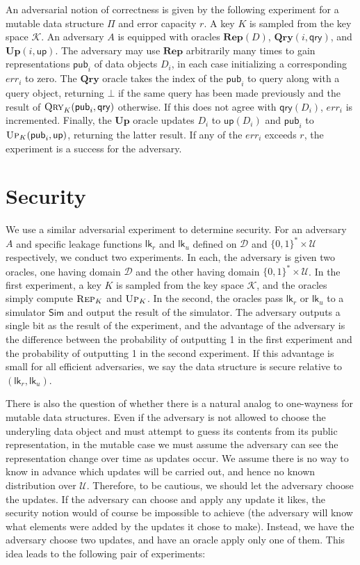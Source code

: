 \documentclass[11pt, pdftex]{article}
\begin{document}
An adversarial notion of correctness is given by the following experiment for a mutable data structure $\Pi$ and error capacity $r$. A key $K$ is sampled from the key space $\mathcal{K}$. An adversary $A$ is equipped with oracles $\mathbf{Rep}(D)$, $\mathbf{Qry}(i,\mathsf{qry})$, and $\mathbf{Up}(i,\mathsf{up})$. The adversary may use $\mathbf{Rep}$ arbitrarily many times to gain representations $\mathsf{pub}_i$ of data objects $D_i$, in each case initializing a corresponding $err_i$ to zero. The $\mathbf{Qry}$ oracle takes the index of the $\mathsf{pub}_i$ to query along with a query object, returning $\bot$ if the same query has been made previously and the result of $\textsc{Qry}_K(\mathsf{pub}_i,\mathsf{qry})$ otherwise. If this does not agree with $\mathsf{qry}(D_i)$, $err_i$ is incremented. Finally, the $\mathbf{Up}$ oracle updates $D_i$ to $\mathsf{up}(D_i)$ and $\mathsf{pub}_i$ to $\textsc{Up}_K(\mathsf{pub}_i,\mathsf{up})$, returning the latter result. If any of the $err_i$ exceeds $r$, the experiment is a success for the adversary.

\section{Security}

We use a similar adversarial experiment to determine security. For an adversary $A$ and specific leakage functions $\mathsf{lk}_r$ and $\mathsf{lk}_u$ defined on $\mathcal{D}$ and $\{0,1\}^* \times \mathcal{U}$ respectively, we conduct two experiments. In each, the adversary is given two oracles, one having domain $\mathcal{D}$ and the other having domain $\{0,1\}^* \times \mathcal{U}$. In the first experiment, a key $K$ is sampled from the key space $\mathcal{K}$, and the oracles simply compute $\textsc{Rep}_K$ and $\textsc{Up}_K$. In the second, the oracles pass $\mathsf{lk}_r$ or $\mathsf{lk}_u$ to a simulator $\mathsf{Sim}$ and output the result of the simulator. The adversary outputs a single bit as the result of the experiment, and the advantage of the adversary is the difference between the probability of outputting 1 in the first experiment and the probability of outputting 1 in the second experiment. If this advantage is small for all efficient adversaries, we say the data structure is secure relative to $(\mathsf{lk}_r,\mathsf{lk}_u)$.

There is also the question of whether there is a natural analog to one-wayness for mutable data structures. Even if the adversary is not allowed to choose the underyling data object and must attempt to guess its contents from its public representation, in the mutable case we must assume the adversary can see the representation change over time as updates occur. We assume there is no way to know in advance which updates will be carried out, and hence no known distribution over $\mathcal{U}$. Therefore, to be cautious, we should let the adversary choose the updates. If the adversary can choose and apply any update it likes, the security notion would of course be impossible to achieve (the adversary will know what elements were added by the updates it chose to make). Instead, we have the adversary choose two updates, and have an oracle apply only one of them. This idea leads to the following pair of experiments:
\end{document}
